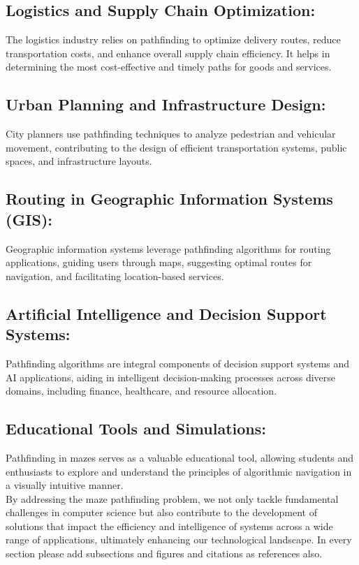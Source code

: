 \documentclass[12pt]{report}
\begin{document}
\subsection{Logistics and Supply Chain Optimization: }
The logistics industry relies on pathfinding to optimize delivery routes, reduce transportation costs, and enhance overall supply chain efficiency. It helps in determining the most cost-effective and timely paths for goods and services.\\


\subsection{Urban Planning and Infrastructure Design:}
City planners use pathfinding techniques to analyze pedestrian and vehicular movement, contributing to the design of efficient transportation systems, public spaces, and infrastructure layouts.\\

 
\subsection{Routing in Geographic Information Systems (GIS): }
Geographic information systems leverage pathfinding algorithms for routing applications, guiding users through maps, suggesting optimal routes for navigation, and facilitating location-based services.\\
 
\subsection{Artificial Intelligence and Decision Support Systems: }
Pathfinding algorithms are integral components of decision support systems and AI applications, aiding in intelligent decision-making processes across diverse domains, including finance, healthcare, and resource allocation.\\

\subsection{Educational Tools and Simulations: }
Pathfinding in mazes serves as a valuable educational tool, allowing students and enthusiasts to explore and understand the principles of algorithmic navigation in a visually intuitive manner.\\

By addressing the maze pathfinding problem, we not only tackle fundamental challenges in computer science but also contribute to the development of solutions that impact the efficiency and intelligence of systems across a wide range of applications, ultimately enhancing our technological landscape.
In every section please add subsections and figures and citations as references\cite{farokhzad2009impact} also.
\end{document}
